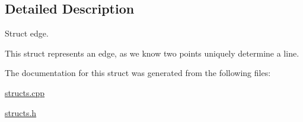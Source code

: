 \subsection{Detailed Description}
Struct edge. 

This struct represents an edge, as we know two points uniquely determine a line. 

The documentation for this struct was generated from the following files\+:\begin{DoxyCompactItemize}
\item 
\hyperlink{structs_8cpp}{structs.\+cpp}\item 
\hyperlink{structs_8h}{structs.\+h}\end{DoxyCompactItemize}
